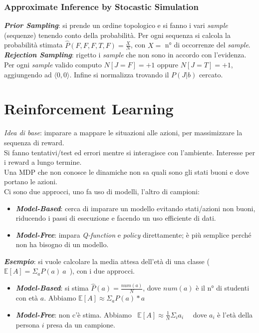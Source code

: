 \documentclass[a4paper, notitlepage, 9pt]{extreport}
\begin{document}
\subsection*{Approximate Inference by Stocastic Simulation}
\textit{\textbf{Prior Sampling}}: si prende un ordine topologico e si fanno i vari \textit{sample} (sequenze) tenendo conto della probabilità. Per ogni sequenza si calcola la probabilità stimata $\hat{P}(F, F, F, T, F) = \frac{X}{N}$, con $X =$ n° di occorrenze del \textit{sample}.\\
\textit{\textbf{Rejection Sampling}}: rigetto i \textit{sample} che non sono in accordo con l'evidenza. Per ogni \textit{sample} valido computo $N[J=F] = +1$ oppure $N[J=T] = +1$, aggiungendo ad $\langle 0, 0 \rangle$. Infine si normalizza trovando il $P(J | b)$ cercato.



\chapter*{Reinforcement Learning}
\textit{Idea di base}: imparare a mappare le situazioni alle azioni, per massimizzare la sequenza di reward.\\
Si fanno tentativi/test ed errori mentre si interagisce con l'ambiente. Interesse per i reward a lungo termine.\\
Una MDP  che non conosce le dinamiche non sa quali sono gli stati buoni e dove portano le azioni.\\
Ci sono due approcci, uno fa uso di modelli, l'altro di campioni:
\begin{itemize}
	\item \textit{\textbf{Model-Based}}: cerca di imparare un modello evitando stati/azioni non buoni, riducendo i passi di esecuzione e facendo un uso efficiente di dati.
	\item \textit{\textbf{Model-Free}}: impara \textit{Q-function} e \textit{policy} direttamente; è più semplice perché non ha bisogno di un modello.
	\newline
\end{itemize}

\textit{\textbf{Esempio}}: si vuole calcolare la media attesa dell'età di una classe (~$\mathbb{E} [A] = \Sigma_a P(a) ~a$~), con i due approcci.
\begin{itemize}
	\item \textit{\textbf{Model-Based}}: si stima $\hat{P}(a) = \frac{num(a)}{N}$, dove $num(a)$ è il n° di studenti con età $a$. Abbiamo $\mathbb{E} [A] \approx \Sigma_a P(a) * a$
	\item \textit{\textbf{Model-Free}}: non c'è stima. Abbiamo ~$\mathbb{E} [A] \approx \frac{1}{N} \Sigma_i a_i$~~ dove $a_i$ è l'età della persona $i$ presa da un campione.
\end{itemize}
\end{document}

